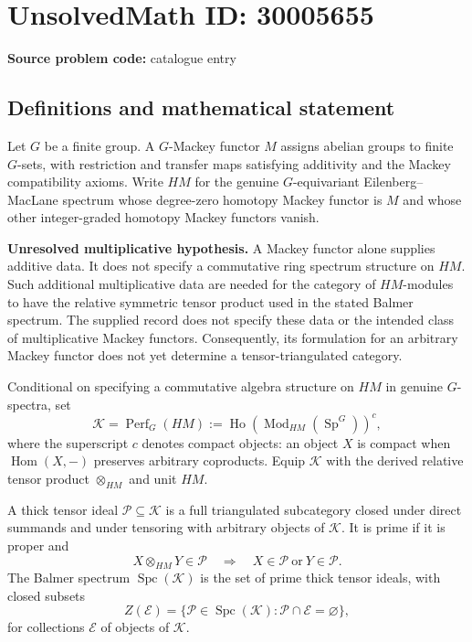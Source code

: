 \documentclass[11pt]{article}
\begin{document}
\section*{UnsolvedMath ID: 30005655}
\textbf{Source problem code:} catalogue entry
\subsection{Definitions and mathematical statement}
Let \(G\) be a finite group. A \(G\)-Mackey functor \(M\) assigns abelian groups to finite \(G\)-sets, with restriction and transfer maps satisfying additivity and the Mackey compatibility axioms. Write \(HM\) for the genuine \(G\)-equivariant Eilenberg--MacLane spectrum whose degree-zero homotopy Mackey functor is \(M\) and whose other integer-graded homotopy Mackey functors vanish.

\textbf{Unresolved multiplicative hypothesis.} A Mackey functor alone supplies additive data. It does not specify a commutative ring spectrum structure on \(HM\). Such additional multiplicative data are needed for the category of \(HM\)-modules to have the relative symmetric tensor product used in the stated Balmer spectrum. The supplied record does not specify these data or the intended class of multiplicative Mackey functors. Consequently, its formulation for an arbitrary Mackey functor does not yet determine a tensor-triangulated category.

Conditional on specifying a commutative algebra structure on \(HM\) in genuine \(G\)-spectra, set
\[
\mathcal K=\operatorname{Perf}_G(HM)
 :=\operatorname{Ho}(\operatorname{Mod}_{HM}(\operatorname{Sp}^{G}))^{c},
\]
where the superscript \(c\) denotes compact objects: an object \(X\) is compact when \(\operatorname{Hom}(X,-)\) preserves arbitrary coproducts. Equip \(\mathcal K\) with the derived relative tensor product \(\otimes_{HM}\) and unit \(HM\).

A thick tensor ideal \(\mathcal P\subseteq\mathcal K\) is a full triangulated subcategory closed under direct summands and under tensoring with arbitrary objects of \(\mathcal K\). It is prime if it is proper and
\[
X\otimes_{HM}Y\in\mathcal P
\quad\Longrightarrow\quad
X\in\mathcal P\ \text{or}\ Y\in\mathcal P.
\]
The Balmer spectrum \(\operatorname{Spc}(\mathcal K)\) is the set of prime thick tensor ideals, with closed subsets
\[
Z(\mathcal E)=\{\mathcal P\in\operatorname{Spc}(\mathcal K):
\mathcal P\cap\mathcal E=\varnothing\},
\]
for collections \(\mathcal E\) of objects of \(\mathcal K\).
\end{document}
